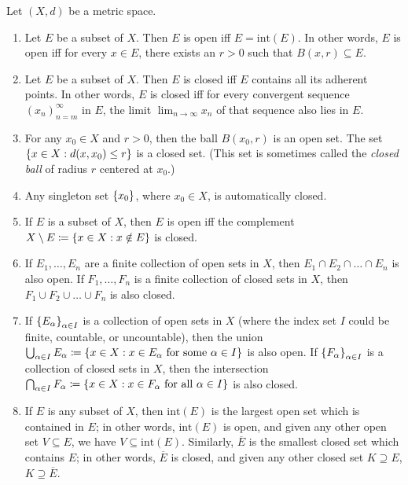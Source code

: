 \begin{prop}\label{ii:1.2.15}
  Let \((X, d)\) be a metric space.
  \begin{enumerate}
    \item Let \(E\) be a subset of \(X\).
          Then \(E\) is open iff \(E = \text{int}(E)\).
          In other words, \(E\) is open iff for every \(x \in E\), there exists an \(r > 0\) such that \(B(x, r) \subseteq E\).
    \item Let \(E\) be a subset of \(X\).
          Then \(E\) is closed iff \(E\) contains all its adherent points.
          In other words, \(E\) is closed iff for every convergent sequence \((x_n)_{n = m}^\infty\) in \(E\), the limit \(\lim_{n \to \infty} x_n\) of that sequence also lies in \(E\).
    \item For any \(x_0 \in X\) and \(r > 0\), then the ball \(B(x_0, r)\) is an open set.
          The set \(\left\lbrace x \in X : d(x, x_0) \leq r\right\rbrace\) is a closed set.
          (This set is sometimes called the \emph{closed ball} of radius \(r\) centered at \(x_0\).)
    \item Any singleton set \(\left\lbrace x_0\right\rbrace\), where \(x_0 \in X\), is automatically closed.
    \item If \(E\) is a subset of \(X\), then \(E\) is open iff the complement \(X \setminus E \coloneqq \left\lbrace x \in X : x \notin E\right\rbrace\) is closed.
    \item If \(E_1, \dots, E_n\) are a finite collection of open sets in \(X\), then \(E_1 \cap E_2 \cap \dots \cap E_n\) is also open.
          If \(F_1, \dots, F_n\) is a finite collection of closed sets in \(X\), then \(F_1 \cup F_2 \cup \dots \cup F_n\) is also closed.
    \item If \(\left\lbrace E_\alpha\right\rbrace_{\alpha \in I}\) is a collection of open sets in \(X\) (where the index set \(I\) could be finite, countable, or uncountable), then the union \(\bigcup_{\alpha \in I} E_\alpha \coloneqq \left\lbrace x \in X : x \in E_\alpha \text{ for some } \alpha \in I\right\rbrace\) is also open.
          If \(\left\lbrace F_\alpha\right\rbrace_{\alpha \in I}\) is a collection of closed sets in \(X\), then the intersection \(\bigcap_{\alpha \in I} F_\alpha \coloneqq \left\lbrace x \in X : x \in F_\alpha \text{ for all } \alpha \in I\right\rbrace\) is also closed.
    \item If \(E\) is any subset of \(X\), then \(\text{int}(E)\) is the largest open set which is contained in \(E\);
          in other words, \(\text{int}(E)\) is open, and given any other open set \(V \subseteq E\), we have \(V \subseteq \text{int}(E)\).
          Similarly, \(\overline{E}\) is the smallest closed set which contains \(E\);
          in other words, \(\overline{E}\) is closed, and given any other closed set \(K \supseteq E\), \(K \supseteq \overline{E}\).
  \end{enumerate}
\end{prop}

